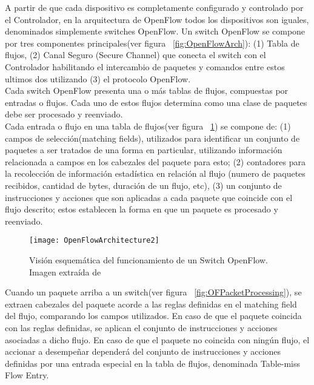 A partir de que cada dispositivo es completamente configurado y controlado por el Controlador, en la arquitectura de OpenFlow todos los dispositivos son iguales, denominados simplemente switches OpenFlow. Un switch OpenFlow se compone por tres componentes principales(ver figura ~\ref{fig:OpenFlowArch}): (1) Tabla de flujos, (2) Canal Seguro (Secure Channel) que conecta el switch con el Controlador habilitando el intercambio de paquetes y comandos entre estos ultimos dos utilizando (3) el protocolo OpenFlow.\\
 
Cada switch OpenFlow presenta una o m\'as tablas de flujos, compuestas por entradas o flujos. Cada uno de estos flujos determina como una clase de paquetes debe ser procesado y reenviado.\\

Cada entrada o flujo en una tabla de flujos(ver figura ~\ref{fig:OpenFlowArch2}) se compone de: (1) campos de selección(matching fields), utilizados para identificar un conjunto de paquetes a ser tratados de una forma en particular, utilizando información relacionada a campos en los cabezales del paquete para esto; (2) contadores para la recolección de información estadística en relación al flujo (numero de paquetes recibidos, cantidad de bytes, duración de un flujo, etc), (3) un conjunto de instrucciones y acciones que son aplicadas a cada paquete que coincide con el flujo descrito; estos establecen la forma en que un paquete es procesado y reenviado.
 
\begin{figure}[htbp!] 
\centering    
\texttt{[image: OpenFlowArchitecture2]}
\caption[Visión esquemática del funcionamiento de un Switch OpenFlow]{Visión esquemática del funcionamiento de un Switch OpenFlow. Imagen extraída de \cite{mckeown2008openflow}}
\label{fig:OpenFlowArch2}
\end{figure}

Cuando un paquete arriba a un switch(ver figura ~\ref{fig:OFPacketProcessing}), se extraen cabezales del paquete acorde a las reglas definidas en el matching field del flujo, comparando los campos utilizados. En caso de que el paquete coincida con las reglas definidas, se aplican el conjunto de instrucciones y acciones asociadas a dicho flujo. En caso de que el paquete no coincida con ningún flujo, el accionar a desempeñar dependerá del conjunto de instrucciones y acciones definidas por una entrada especial en la tabla de flujos, denominada Table-miss Flow Entry.\\ 

